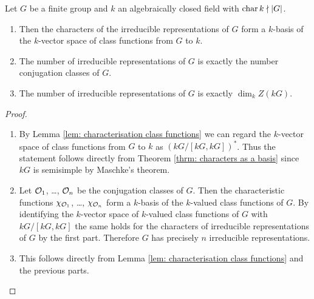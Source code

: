 \begin{prop} \label{prop: conjugation classes and irreducible representations}
  Let $G$ be a finite group and $k$ an algebraically closed field with $\operatorname{char} k \nmid |G|$.
  \begin{enumerate}[label=\emph{\alph*)}, leftmargin=*]
    \item
      Then the characters of the irreducible representations of $G$ form a $k$-basis of the $k$-vector space of class functions from $G$ to $k$.
    \item
      The number of irreducible representations of $G$ is exactly the number conjugation classes of $G$.
    \item
      The number of irreducible representations of $G$ is exactly $\dim_k Z(kG)$.
  \end{enumerate}
\end{prop}
\begin{proof}
  \begin{enumerate}[label=\emph{\alph*)}, leftmargin=*]
    \item
      By Lemma \ref{lem: characterisation class functions} we can regard the $k$-vector space of class functions from $G$ to $k$ as $(kG/[kG,kG])^*$. Thus the statement follows directly from Theorem \ref{thrm: characters as a basis} since $kG$ is semisimple by Maschke’s theorem.
    \item
      Let $\mathcal{O}_1$, \dots, $\mathcal{O}_n$ be the conjugation classes of $G$. Then the characteristic functions $\chi_{\mathcal{O}_1}$, \dots, $\chi_{\mathcal{O}_n}$ form a $k$-basis of the $k$-valued class functions of $G$. By identifying the $k$-vector space of $k$-valued class functions of $G$ with $kG/[kG,kG]$ the same holds for the characters of irreducible representations of $G$ by the first part. Therefore $G$ has precisely $n$ irreducible representations.
    \item
      This follows directly from Lemma \ref{lem: characterisation class functions} and the previous parts.
  \end{enumerate}
\end{proof}


